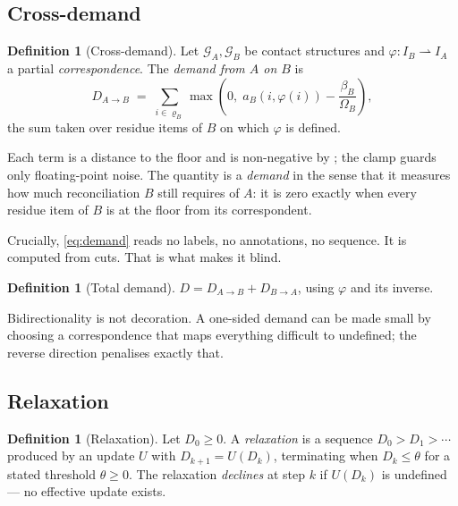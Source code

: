 \documentclass[11pt,twocolumn,a4paper]{article}
\theoremstyle{plain}
\theoremstyle{definition}
\newtheorem{definition}[theorem]{Definition}
\theoremstyle{remark}
\newcommand{\flo}{\beta}                       %
\newcommand{\Res}{\varrho}                     %
\newcommand{\Gph}{\mathcal{G}}
\newcommand{\Om}{\Omega}
\newcommand{\dem}{D}
\newcommand{\corr}{\varphi}
\begin{document}
\subsection{Cross-demand}

\begin{definition}[Cross-demand]
\label{def:crossdemand}
Let $\Gph_A,\Gph_B$ be contact structures and
$\corr: I_B \rightharpoonup I_A$ a partial \emph{correspondence}. The
\emph{demand from $A$ on $B$} is
\begin{equation}
\label{eq:demand}
  \dem_{A\to B}
  \;=\;
  \sum_{i\in \Res_B}
  \max\!\left(0,\;
    a_B\!\left(i,\corr(i)\right)-\frac{\flo_B}{\Om_B}
  \right),
\end{equation}
the sum taken over residue items of $B$ on which $\corr$ is defined.
\end{definition}

Each term is a distance to the floor and is non-negative by
; the clamp guards only floating-point noise. The
quantity is a \emph{demand} in the sense that it measures how much
reconciliation $B$ still requires of $A$: it is zero exactly when every
residue item of $B$ is at the floor from its correspondent.

Crucially, \eqref{eq:demand} reads no labels, no annotations, no
sequence. It is computed from cuts. That is what makes it blind.

\begin{definition}[Total demand]
$\dem = \dem_{A\to B} + \dem_{B\to A}$, using $\corr$ and its inverse.
\end{definition}

Bidirectionality is not decoration. A one-sided demand can be made
small by choosing a correspondence that maps everything difficult to
undefined; the reverse direction penalises exactly that.

\subsection{Relaxation}

\begin{definition}[Relaxation]
\label{def:relax}
Let $\dem_0\ge0$. A \emph{relaxation} is a sequence
$\dem_0>\dem_1>\cdots$ produced by an update $U$ with
$\dem_{k+1}=U(\dem_k)$, terminating when $\dem_k\le\theta$ for a stated
threshold $\theta\ge0$. The relaxation \emph{declines} at step $k$ if
$U(\dem_k)$ is undefined --- no effective update exists.
\end{definition}
\end{document}
